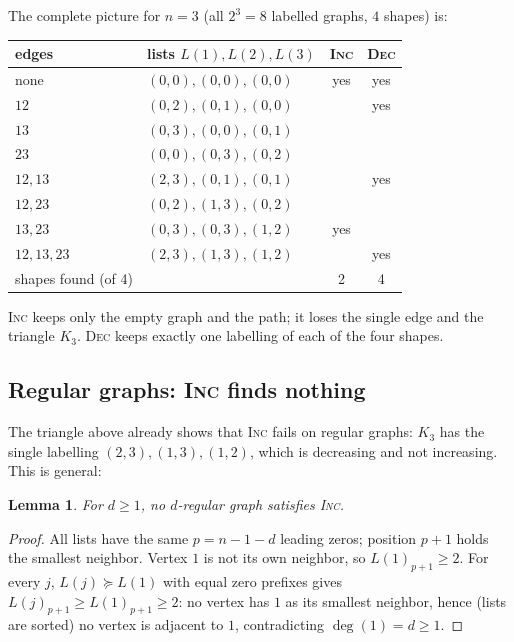 \documentclass[11pt,a4paper]{article}
\newtheorem{lemma}[theorem]{Lemma}
\theoremstyle{definition}
\theoremstyle{remark}
\newcommand{\Lst}{L}
\begin{document}
The complete picture for $n=3$ (all $2^3=8$ labelled graphs, $4$ shapes) is:

\begin{center}
\begin{tabular}{l l c c}
\toprule
edges & lists $\Lst(1),\Lst(2),\Lst(3)$ & \textsc{Inc} & \textsc{Dec}\\
\midrule
none            & $(0,0),(0,0),(0,0)$ & yes & yes\\
$12$            & $(0,2),(0,1),(0,0)$ &     & yes\\
$13$            & $(0,3),(0,0),(0,1)$ &     &    \\
$23$            & $(0,0),(0,3),(0,2)$ &     &    \\
$12,13$         & $(2,3),(0,1),(0,1)$ &     & yes\\
$12,23$         & $(0,2),(1,3),(0,2)$ &     &    \\
$13,23$         & $(0,3),(0,3),(1,2)$ & yes &    \\
$12,13,23$      & $(2,3),(1,3),(1,2)$ &     & yes\\
\midrule
shapes found (of 4) & & 2 & 4\\
\bottomrule
\end{tabular}
\end{center}

\textsc{Inc} keeps only the empty graph and the path; it loses the single edge and the
triangle $K_3$. \textsc{Dec} keeps exactly one labelling of each of the four shapes.

\subsection{Regular graphs: \textsc{Inc} finds nothing}

The triangle above already shows that \textsc{Inc} fails on regular graphs: $K_3$ has the single
labelling $(2,3),(1,3),(1,2)$, which is decreasing and not increasing. This is general:

\begin{lemma}\label{lem:incregular}
For $d\ge 1$, no $d$-regular graph satisfies \textsc{Inc}.
\end{lemma}

\begin{proof}
All lists have the same $p=n-1-d$ leading zeros; position $p+1$ holds the smallest neighbor.
Vertex $1$ is not its own neighbor, so $\Lst(1)_{p+1}\ge 2$. For every $j$,
$\Lst(j)\succeq\Lst(1)$ with equal zero prefixes gives $\Lst(j)_{p+1}\ge\Lst(1)_{p+1}\ge 2$:
no vertex has $1$ as its smallest neighbor, hence (lists are sorted) no vertex is adjacent to
$1$, contradicting $\deg(1)=d\ge1$.
\end{proof}
\end{document}
